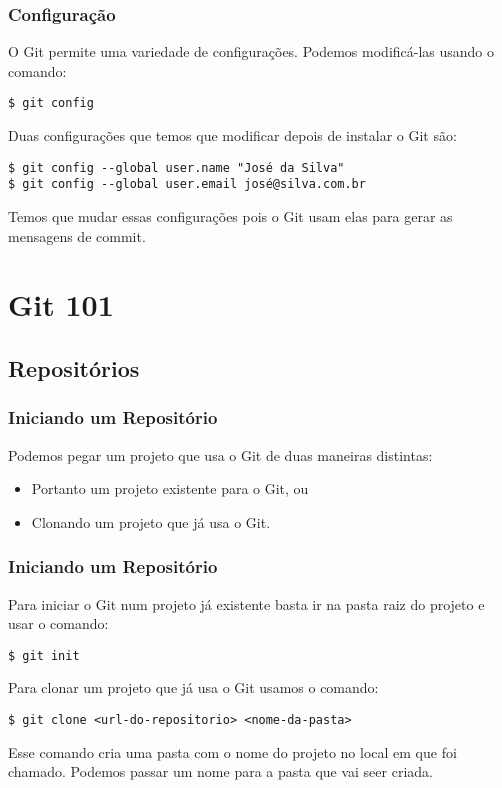 \documentclass[brazil]{beamer}
\begin{document}
\begin{frame}[fragile]
  \frametitle{Configuração}
  O Git permite uma variedade de configurações. Podemos modificá-las usando o comando:
  \begin{block}{}
    \verb#$ git config#
  \end{block}
  \pause
  Duas configurações que temos que modificar depois de instalar o Git são:
  \begin{block}{}
      \verb#$ git config --global user.name "José da Silva"# \\
      \verb#$ git config --global user.email josé@silva.com.br#
  \end{block}
  Temos que mudar essas configurações pois o Git usam elas para gerar as mensagens de commit.
\end{frame}

\section{Git 101}

\subsection{Repositórios}

\begin{frame}[fragile]
  \frametitle{Iniciando um Repositório}
  Podemos pegar um projeto que usa o Git de duas maneiras distintas:
  \begin{itemize}
    \item Portanto um projeto existente para o Git, ou
    \item Clonando um projeto que já usa o Git.
  \end{itemize}
\end{frame}

\begin{frame}[fragile]
  \frametitle{Iniciando um Repositório}
  Para iniciar o Git num projeto já existente basta ir na pasta raiz do projeto e usar o comando:
  \begin{block}{}
    \verb#$ git init#
  \end{block}
  \pause
  Para clonar um projeto que já usa o Git usamos o comando:
  \begin{block}{}
    \verb#$ git clone <url-do-repositorio> <nome-da-pasta>#
  \end{block}
  Esse comando cria uma pasta com o nome do projeto no local em que foi chamado. Podemos
  passar um nome para a pasta que vai seer criada.
\end{frame}
\end{document}
